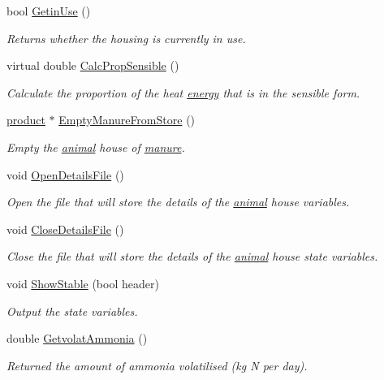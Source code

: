 \begin{DoxyCompactItemize}
bool \hyperlink{classstable_a556b940db4c05999073d72bfee6adbbc}{GetinUse} ()
\begin{DoxyCompactList}\small\item\em Returns whether the housing is currently in use. \item\end{DoxyCompactList}\item 
virtual double \hyperlink{classstable_a194dfcdf2c3f49d3683205ef972fd674}{CalcPropSensible} ()
\begin{DoxyCompactList}\small\item\em Calculate the proportion of the heat \hyperlink{classenergy}{energy} that is in the sensible form. \item\end{DoxyCompactList}\item 
\hyperlink{classproduct}{product} $\ast$ \hyperlink{classstable_a29cdecb2508e0504a5382d6d13b123a9}{EmptyManureFromStore} ()
\begin{DoxyCompactList}\small\item\em Empty the \hyperlink{classanimal}{animal} house of \hyperlink{classmanure}{manure}. \item\end{DoxyCompactList}\item 
void \hyperlink{classstable_a893832014c2956195ca9316345456ab5}{OpenDetailsFile} ()
\begin{DoxyCompactList}\small\item\em Open the file that will store the details of the \hyperlink{classanimal}{animal} house variables. \item\end{DoxyCompactList}\item 
void \hyperlink{classstable_a13fcbf0229ba9f7ce566505f1ea23d5b}{CloseDetailsFile} ()
\begin{DoxyCompactList}\small\item\em Close the file that will store the details of the \hyperlink{classanimal}{animal} house state variables. \item\end{DoxyCompactList}\item 
void \hyperlink{classstable_a1d024423d843bb60ff772cfebc61b1ef}{ShowStable} (bool header)
\begin{DoxyCompactList}\small\item\em Output the state variables. \item\end{DoxyCompactList}\item 
double \hyperlink{classstable_a512896f7eb1325fc52e1c87e2ad128e3}{GetvolatAmmonia} ()
\begin{DoxyCompactList}\small\item\em Returned the amount of ammonia volatilised (kg N per day). \item\end{DoxyCompactList}\end{DoxyCompactItemize}
